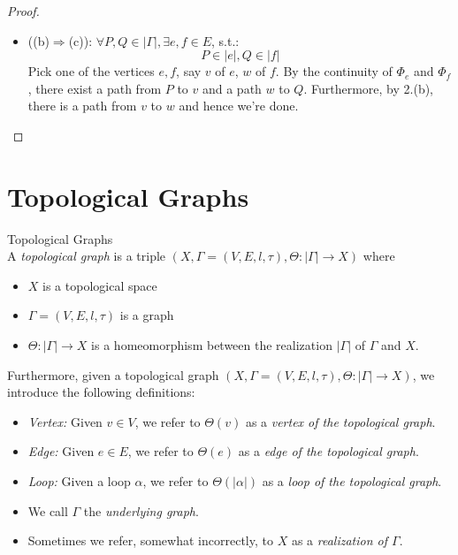 \begin{proof}
\begin{enumerate}
\begin{itemize}
            \item ((b)$\Rightarrow$(c)): $\forall P,Q \in |\Gamma|, \exists e,f\in E$, s.t.:
            $$P \in |e|, Q \in |f|$$
            Pick one of the vertices $e,f$, say $v$ of $e$, $w$ of $f$. By the continuity of $\Phi_e$ and $\Phi_f$, there exist a path from $P$ to $v$ and a path $w$ to $Q$. Furthermore, by 2.(b), there is a path from $v$ to $w$ and hence we're done.
        \end{itemize}
    \end{enumerate}
\end{proof}

\section{Topological Graphs}

\begin{definition}{Topological Graphs}\\
A \textit{topological graph} is a triple $(X, \Gamma= (V,E,l,\tau), \Theta: |\Gamma| \to X)$ where
\begin{itemize}
    \item $X$ is a topological space
    \item $\Gamma= (V,E,l,\tau)$ is a graph
    \item $\Theta: |\Gamma| \to X$ is a homeomorphism between the realization $|\Gamma|$ of $\Gamma$ and $X$.
\end{itemize}
Furthermore, given a topological graph $(X,\Gamma=(V,E,l,\tau), \Theta: |\Gamma| \to X)$, we introduce the following definitions:
\begin{itemize}
    \item \textit{Vertex:} Given $v \in V$, we refer to $\Theta(v)$ as a \textit{vertex of the topological graph}.
    \item \textit{Edge:} Given $e\in E$, we refer to $\Theta(e)$ as a \textit{edge of the topological graph}.
    \item \textit{Loop:} Given a loop $\alpha$, we refer to $\Theta (|\alpha|)$ as a \textit{loop of the topological graph}.
    \item We call $\Gamma$ the \textit{underlying graph}.
    \item Sometimes we refer, somewhat incorrectly, to $X$ as a \textit{realization of $\Gamma$}.
\end{itemize}
\end{definition}

